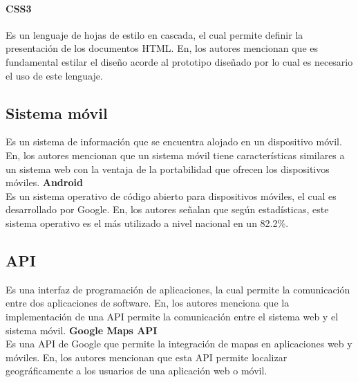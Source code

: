 \paragraph{CSS3}
Es un lenguaje de hojas de estilo en cascada, el cual permite definir la presentación de los documentos HTML. En\cite{izaDesarrolloERPPara2023}, los autores mencionan que es fundamental estilar el diseño acorde al prototipo diseñado por lo cual es necesario el uso de este lenguaje.

\subsection{Sistema móvil}\label{subsec:sistema-movil}
Es un sistema de información que se encuentra alojado en un dispositivo móvil. En\cite{ortegaAnalisisDisenoImplementacion2017, leonardoMejoraControlAsistencia2019, izaDesarrolloERPPara2023}, los autores mencionan que un sistema móvil tiene características similares a un sistema web con la ventaja de la portabilidad que ofrecen los dispositivos móviles.
\bigbreak
\textbf {Android} \\
Es un sistema operativo de código abierto para dispositivos móviles, el cual es desarrollado por Google. En\cite{ortegaAnalisisDisenoImplementacion2017}, los autores señalan que según estadísticas, este sistema operativo es el más utilizado a nivel nacional en un 82.2\%.

\subsection{API}\label{subsec:api}
Es una interfaz de programación de aplicaciones, la cual permite la comunicación entre dos aplicaciones de software. En\cite{leonardoMejoraControlAsistencia2019, montalvoDesarrolloSistemaSoftware2023}, los autores menciona que la implementación de una API permite la comunicación entre el sistema web y el sistema móvil.
\bigbreak
\textbf{Google Maps API} \\
Es una API de Google que permite la integración de mapas en aplicaciones web y móviles. En\cite{izaDesarrolloERPPara2023, castroReconocimientoFacialGeolocalizacion2023}, los autores mencionan que esta API permite localizar geográficamente a los usuarios de una aplicación web o móvil.


